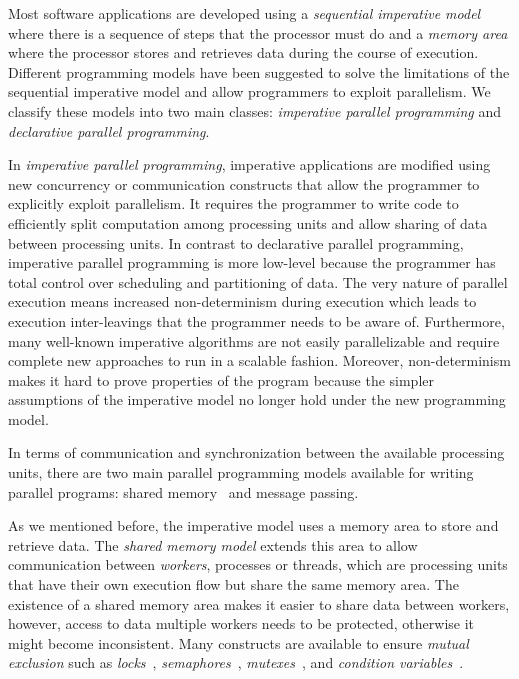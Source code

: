 Most software applications are developed using a \emph{sequential imperative
model} where there is a sequence of steps that the processor must do and a
\emph{memory area} where the processor stores and retrieves data during the
course of execution. Different programming models have been suggested to solve
the limitations of the sequential imperative model and allow programmers to
exploit parallelism. We classify these models into two main classes:
\emph{imperative parallel programming} and \emph{declarative parallel
programming}.

In \emph{imperative parallel programming}, imperative applications are modified
using new concurrency or communication constructs that allow the programmer to
explicitly exploit parallelism. It requires the programmer to write code to
efficiently split computation among processing units and allow sharing of data
between processing units. In contrast to declarative parallel programming,
imperative parallel programming is more low-level because the programmer has
total control over scheduling and partitioning of data. The very nature of
parallel execution means increased non-determinism during execution which leads
to execution inter-leavings that the programmer needs to be aware of.
Furthermore, many well-known imperative algorithms are not easily parallelizable
and require complete new approaches to run in a scalable fashion. Moreover,
non-determinism makes it hard to prove properties of the program because the
simpler assumptions of the imperative model no longer hold under the new
programming model.

In terms of communication and synchronization between the available processing
units, there are two main parallel programming models available for writing
parallel programs: shared memory~\cite{Mellor-Crummey:1991} and message passing.

As we mentioned before, the imperative model uses a memory area to store and
retrieve data. The \emph{shared memory model} extends this area to allow
communication between \emph{workers}, processes or threads, which are processing
units that have their own execution flow but share the same memory area. The
existence of a shared memory area makes it easier to share data between workers,
however, access to data multiple workers needs to be protected, otherwise it
might become inconsistent. Many constructs are available to ensure \emph{mutual
exclusion} such as \emph{locks}~\cite{Silberschatz:2008},
\emph{semaphores}~\cite{Dijkstra:2002}, \emph{mutexes}~\cite{Silberschatz:2008},
and \emph{condition variables}~\cite{Hoare:1974}.


